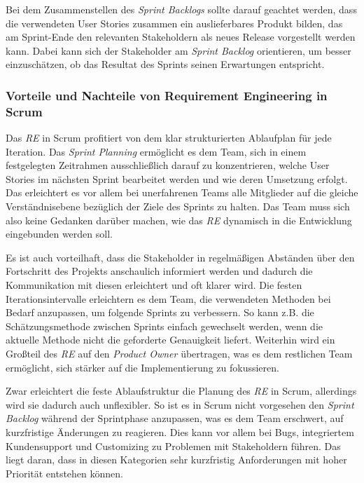 \documentclass[acmtog]{acmart}
\begin{document}
Bei dem Zusammenstellen des \emph{Sprint Backlogs} sollte darauf geachtet werden, dass die verwendeten User Stories zusammen ein auslieferbares 
Produkt bilden, das am Sprint-Ende den relevanten Stakeholdern als neues Release vorgestellt werden kann. Dabei kann sich der Stakeholder 
am \emph{Sprint Backlog} orientieren, um besser einzuschätzen, ob das Resultat des Sprints seinen Erwartungen entspricht. \cite{reinscrum}

\subsubsection{Vorteile und Nachteile von Requirement Engineering in Scrum}

Das \emph{RE} in Scrum profitiert von dem klar strukturierten Ablaufplan für jede Iteration. Das \emph{Sprint Planning} ermöglicht es dem Team, sich in einem festgelegten Zeitrahmen 
ausschließlich darauf zu konzentrieren, welche User Stories im nächsten Sprint bearbeitet werden und wie deren Umsetzung erfolgt. Das erleichtert es vor 
allem bei unerfahrenen Teams alle Mitglieder auf die gleiche Verständnisebene bezüglich der Ziele des Sprints zu halten. Das Team muss sich 
also keine Gedanken darüber machen, wie das \emph{RE} dynamisch in die Entwicklung eingebunden werden soll.

Es ist auch vorteilhaft, dass die Stakeholder in regelmäßigen Abständen über den Fortschritt des Projekts anschaulich informiert werden und 
dadurch die Kommunikation mit diesen erleichtert und oft klarer wird. Die festen Iterationsintervalle erleichtern es dem Team, die verwendeten Methoden bei 
Bedarf anzupassen, um folgende Sprints zu verbessern. So kann z.B. die Schätzungsmethode zwischen Sprints einfach gewechselt 
werden, wenn die aktuelle Methode nicht die geforderte Genauigkeit liefert.
Weiterhin wird ein Großteil des \emph{RE} auf den \emph{Product Owner} übertragen, was es dem restlichen Team ermöglicht, sich stärker auf die Implementierung zu fokussieren.

Zwar erleichtert die feste Ablaufstruktur die Planung des \emph{RE} in Scrum, allerdings wird sie dadurch auch unflexibler. So ist es in Scrum nicht 
vorgesehen den \emph{Sprint Backlog} während der Sprintphase anzupassen, was es dem Team erschwert, auf kurzfristige Änderungen zu reagieren. Dies 
kann vor allem bei Bugs, integriertem Kundensupport und Customizing zu Problemen mit Stakeholdern führen. Das liegt daran, dass in 
diesen Kategorien sehr kurzfristig Anforderungen mit hoher Priorität entstehen können.
\end{document}
